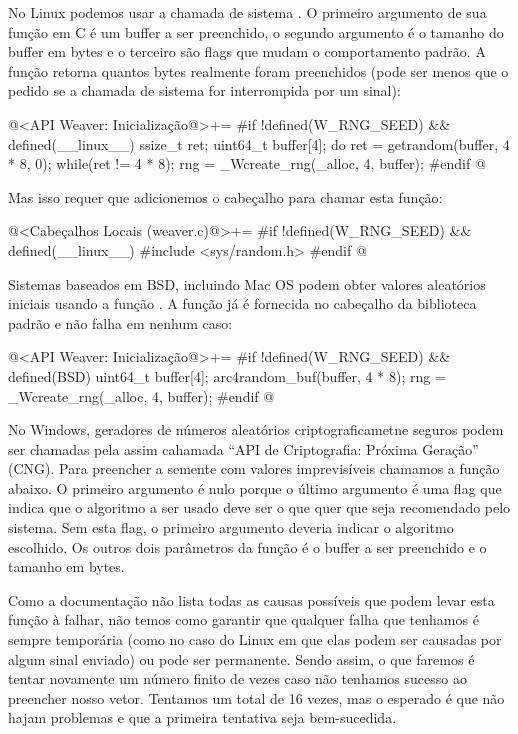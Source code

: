 No Linux podemos usar a chamada de sistema . O
primeiro argumento de sua função em C é um buffer a ser preenchido, o
segundo argumento é o tamanho do buffer em bytes e o terceiro são
flags que mudam o comportamento padrão. A função retorna quantos bytes
realmente foram preenchidos (pode ser menos que o pedido se a chamada
de sistema for interrompida por um sinal):

\iniciocodigo
@<API Weaver: Inicialização@>+=
#if !defined(W_RNG_SEED) && defined(__linux__)
{
  ssize_t ret;
  uint64_t buffer[4];
  do{
    ret = getrandom(buffer, 4 * 8, 0);
  }while(ret != 4 * 8);
  rng = _Wcreate_rng(_alloc, 4, buffer);
}
#endif
@
\fimcodigo

Mas isso requer que adicionemos o cabeçalho para chamar esta função:

\iniciocodigo
@<Cabeçalhos Locais (weaver.c)@>+=
#if !defined(W_RNG_SEED) && defined(__linux__)
#include <sys/random.h>
#endif
@
\fimcodigo

Sistemas baseados em BSD, incluindo Mac OS podem obter valores
aleatórios iniciais usando a função . A
função já é fornecida no cabeçalho da biblioteca padrão e não falha em
nenhum caso:

\iniciocodigo
@<API Weaver: Inicialização@>+=
#if !defined(W_RNG_SEED) && defined(BSD)
{
  uint64_t buffer[4];
  arc4random_buf(buffer, 4 * 8);
  rng = _Wcreate_rng(_alloc, 4, buffer);
}
#endif
@
\fimcodigo

No Windows, geradores de números aleatórios criptograficametne seguros
podem ser chamadas pela assim cahamada ``API de Criptografia: Próxima
Geração'' (CNG). Para preencher a semente com valores imprevisíveis
chamamos a função abaixo. O primeiro argumento é nulo porque o último
argumento é uma flag que indica que o algoritmo a ser usado deve ser o
que quer que seja recomendado pelo sistema. Sem esta flag, o primeiro
argumento deveria indicar o algoritmo escolhido. Os outros dois
parâmetros da função é o buffer a ser preenchido e o tamanho em bytes.

Como a documentação não lista todas as causas possíveis que podem
levar esta função à falhar, não temos como garantir que qualquer falha
que tenhamos é sempre temporária (como no caso do Linux em que elas
podem ser causadas por algum sinal enviado) ou pode ser
permanente. Sendo assim, o que faremos é tentar novamente um número
finito de vezes caso não tenhamos sucesso ao preencher nosso
vetor. Tentamos um total de 16 vezes, mas o esperado é que não hajam
problemas e que a primeira tentativa seja bem-sucedida.

